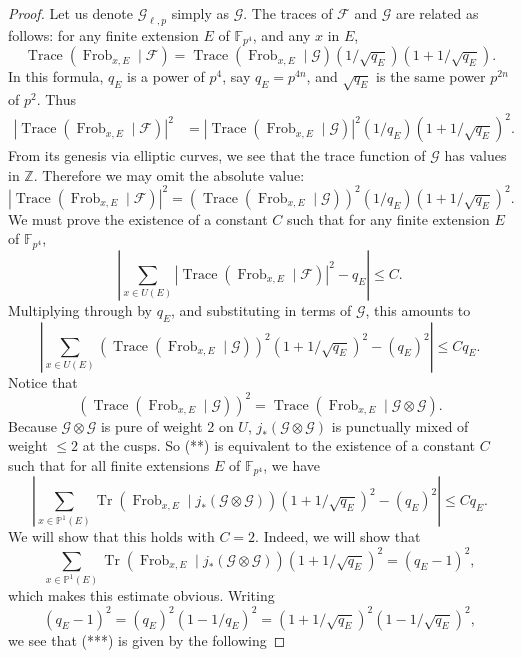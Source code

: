 \begin{proof}
Let us denote \(\mathcal{G}_{\ell,p}\) simply as \(\mathcal{G}\). The traces of \(\mathcal{F}\) and \(\mathcal{G}\) are related as follows: for any finite extension \(E\) of \(\mathbb{F}_{p^4}\), and any \(x\) in \(E\),
\[
\operatorname{Trace}(\operatorname{Frob}_{x,E}\mid\mathcal{F})
=\operatorname{Trace}(\operatorname{Frob}_{x,E}\mid\mathcal{G})(1/\sqrt{q_E})(1+1/\sqrt{q_E}).
\]
In this formula, \(q_E\) is a power of \(p^4\), say \(q_E=p^{4n}\), and \(\sqrt{q_E}\) is the same power \(p^{2n}\) of \(p^2\). Thus
\[
\begin{aligned}
|\operatorname{Trace}(\operatorname{Frob}_{x,E}\mid\mathcal{F})|^2
&=|\operatorname{Trace}(\operatorname{Frob}_{x,E}\mid\mathcal{G})|^2(1/q_E)(1+1/\sqrt{q_E})^2.
\end{aligned}
\]
From its genesis via elliptic curves, we see that the trace function of \(\mathcal{G}\) has values in \(\mathbb{Z}\). Therefore we may omit the absolute value:
\[
|\operatorname{Trace}(\operatorname{Frob}_{x,E}\mid\mathcal{F})|^2
=(\operatorname{Trace}(\operatorname{Frob}_{x,E}\mid\mathcal{G}))^2(1/q_E)(1+1/\sqrt{q_E})^2.
\]
We must prove the existence of a constant \(C\) such that for any finite extension \(E\) of \(\mathbb{F}_{p^4}\),
\[
\tag{*}
\left|\sum_{x\in U(E)}|\operatorname{Trace}(\operatorname{Frob}_{x,E}\mid\mathcal{F})|^2-q_E\right|\leq C.
\]
Multiplying through by \(q_E\), and substituting in terms of \(\mathcal{G}\), this amounts to
\[
\tag{**}
\left|\sum_{x\in U(E)}(\operatorname{Trace}(\operatorname{Frob}_{x,E}\mid\mathcal{G}))^2(1+1/\sqrt{q_E})^2-(q_E)^2\right|\leq Cq_E.
\]
Notice that
\[
(\operatorname{Trace}(\operatorname{Frob}_{x,E}\mid\mathcal{G}))^2
=\operatorname{Trace}(\operatorname{Frob}_{x,E}\mid\mathcal{G}\otimes\mathcal{G}).
\]
Because \(\mathcal{G}\otimes\mathcal{G}\) is pure of weight 2 on \(U\), \(j_*(\mathcal{G}\otimes\mathcal{G})\) is punctually mixed of weight \(\leq2\) at the cusps. So (**) is equivalent to the existence of a constant \(C\) such that for all finite extensions \(E\) of \(\mathbb{F}_{p^4}\), we have
\[
\left|\sum_{x\in\mathbb{P}^1(E)}\operatorname{Tr}(\operatorname{Frob}_{x,E}\mid j_*(\mathcal{G}\otimes\mathcal{G}))(1+1/\sqrt{q_E})^2-(q_E)^2\right|\leq Cq_E.
\]
We will show that this holds with \(C=2\). Indeed, we will show that
\[
\tag{***}
\sum_{x\in\mathbb{P}^1(E)}\operatorname{Tr}(\operatorname{Frob}_{x,E}\mid j_*(\mathcal{G}\otimes\mathcal{G}))(1+1/\sqrt{q_E})^2=(q_E-1)^2,
\]
which makes this estimate obvious. Writing
\[
(q_E-1)^2=(q_E)^2(1-1/q_E)^2=(1+1/\sqrt{q_E})^2(1-1/\sqrt{q_E})^2,
\]
we see that (***) is given by the following


\end{proof}
